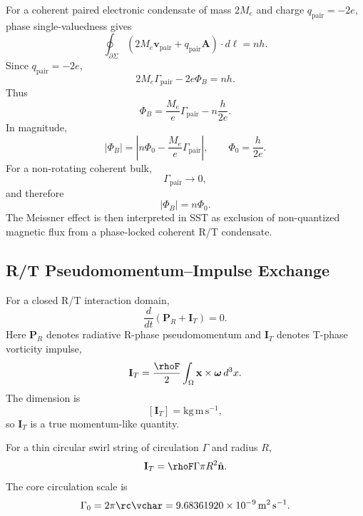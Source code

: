         For a coherent paired electronic condensate of mass \(2M_e\) and charge
        \(q_{\mathrm{pair}}=-2e\), phase single-valuedness gives
        \[
            \oint_{\partial\Sigma}
            \left(
                2M_e\mathbf v_{\mathrm{pair}}
                +
                q_{\mathrm{pair}}\mathbf A
            \right)\cdot d\boldsymbol\ell
            =
            nh .
        \]
        Since \(q_{\mathrm{pair}}=-2e\),
        \[
            2M_e\Gamma_{\mathrm{pair}}
            -
            2e\Phi_B
            =
            nh .
        \]
        Thus
        \[
            \Phi_B
            =
            \frac{M_e}{e}\Gamma_{\mathrm{pair}}
            -
            n\frac{h}{2e}.
        \]
        In magnitude,
        \[
            |\Phi_B|
            =
            \left|
                n\Phi_0
            -
                \frac{M_e}{e}\Gamma_{\mathrm{pair}}
            \right|,
            \qquad
            \Phi_0=\frac{h}{2e}.
        \]
        For a non-rotating coherent bulk,
        \[
            \Gamma_{\mathrm{pair}}\to 0,
        \]
        and therefore
        \[
            |\Phi_B|=n\Phi_0.
        \]
        The Meissner effect is then interpreted in SST as exclusion of non-quantized
        magnetic flux from a phase-locked coherent R/T condensate.
    
    \subsection{R/T Pseudomomentum--Impulse Exchange}
        
        For a closed R/T interaction domain,
        \[
            \frac{d}{dt}
            \left(
                \mathbf P_R+\mathbf I_T
            \right)
            =
            0.
        \]
        Here \(\mathbf P_R\) denotes radiative R-phase pseudomomentum and
        \(\mathbf I_T\) denotes T-phase vorticity impulse,
        \[
            \mathbf I_T
            =
            \frac{\rhoF}{2}
            \int_{\Omega}
            \mathbf x\times\boldsymbol\omega\,d^3x .
        \]
        The dimension is
        \[
            [\mathbf I_T]
            =
            \mathrm{kg\,m\,s^{-1}},
        \]
        so \(\mathbf I_T\) is a true momentum-like quantity.
        
        For a thin circular swirl string of circulation \(\Gamma\) and radius \(R\),
        \[
            \mathbf I_T
            =
            \rhoF\Gamma\pi R^2\hat{\mathbf n}.
        \]
        The core circulation scale is
        \[
            \Gamma_0
            =
            2\pi \rc\vchar
            =
            9.68361920\times10^{-9}\,\mathrm{m^2\,s^{-1}}.
        \]
    

